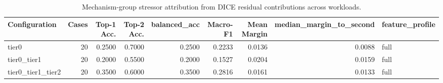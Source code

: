 \begin{table}[t]
\centering
\caption{Mechanism-group stressor attribution from DICE residual contributions across workloads.}
\label{tab:dice_stressor_diagnosis}
\footnotesize
\begin{tabular}{lrrrrrrrl}
\toprule
Configuration & Cases & Top-1 Acc. & Top-2 Acc. & balanced_acc & Macro-F1 & Mean Margin & median_margin_to_second & feature_profile \\
\midrule
tier0 & 20 & 0.2500 & 0.7000 & 0.2500 & 0.2233 & 0.0136 & 0.0088 & full \\
tier0_tier1 & 20 & 0.2000 & 0.5500 & 0.2000 & 0.1527 & 0.0204 & 0.0159 & full \\
tier0_tier1_tier2 & 20 & 0.3500 & 0.6000 & 0.3500 & 0.2816 & 0.0161 & 0.0133 & full \\
\bottomrule
\end{tabular}

\end{table}
